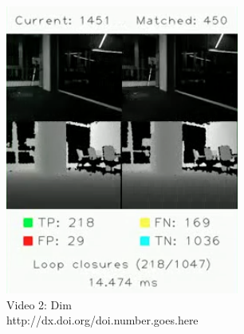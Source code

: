 \documentclass[]{spie}  %
\begin{document}
\begin{figure}
\begin{subfigure}[b]{0.32\textwidth}
        \includegraphics[trim = 0mm 0mm 0mm 0mm, clip, width=\textwidth]{figures/video_dim.png}    
        \caption{Video 2: Dim\vspace{1mm}\\\scriptsize{http://dx.doi.org/doi.number.goes.here}}
        \label{subfig:video_dim}
        \end{subfigure}
         ~ 
        \begin{subfigure}[b]{0.32\textwidth}
        \centering

\end{subfigure}
\end{figure}
\end{document}
